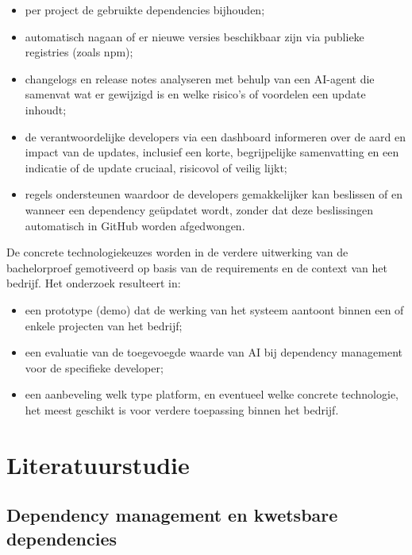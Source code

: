 \begin{itemize}
  \item per project de gebruikte dependencies bijhouden;
  \item automatisch nagaan of er nieuwe versies beschikbaar zijn via publieke registries (zoals npm);
  \item changelogs en release notes analyseren met behulp van een AI-agent die samenvat wat er gewijzigd is en welke risico's of voordelen een update inhoudt;
  \item de verantwoordelijke developers via een dashboard informeren over de aard en impact van de updates, inclusief een korte, begrijpelijke samenvatting en een indicatie of de update cruciaal, risicovol of veilig lijkt;
  \item regels ondersteunen waardoor de developers gemakkelijker kan beslissen of en wanneer een dependency geüpdatet wordt, zonder dat deze beslissingen automatisch in GitHub worden afgedwongen.
\end{itemize}

De concrete technologiekeuzes worden in de verdere uitwerking van de bachelorproef gemotiveerd op basis van de requirements en de context van het bedrijf. Het onderzoek resulteert in:

\begin{itemize}
  \item een prototype (demo) dat de werking van het systeem aantoont binnen een of enkele projecten van het bedrijf;
  \item een evaluatie van de toegevoegde waarde van AI bij dependency management voor de specifieke developer;
  \item een aanbeveling welk type platform, en eventueel welke concrete technologie, het meest geschikt is voor verdere toepassing binnen het bedrijf.
\end{itemize}


\section{Literatuurstudie}
\label{sec:literatuurstudie}

\subsection{Dependency management en kwetsbare dependencies}

